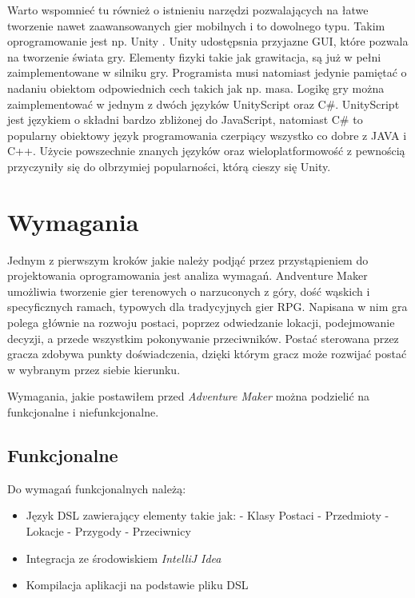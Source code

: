 \documentclass[openright]{xmgr}
\begin{document}
Warto wspomnieć tu również o istnieniu narzędzi pozwalających na łatwe tworzenie nawet zaawansowanych gier mobilnych i to dowolnego typu. Takim oprogramowanie jest np. Unity \cite{Unity3D:2017:Doc}. Unity udostępsnia przyjazne GUI, które pozwala na tworzenie świata gry. Elementy fizyki takie jak grawitacja, są już w pełni zaimplementowane w silniku gry. Programista musi natomiast jedynie pamiętać o nadaniu obiektom odpowiednich cech takich jak np. masa. Logikę gry można zaimplementować w jednym z dwóch języków UnityScript oraz C\#. UnityScript jest językiem o składni bardzo zbliżonej do JavaScript, natomiast C\# to popularny obiektowy język programowania czerpiący wszystko co dobre z JAVA i C++. Użycie powszechnie znanych języków oraz wieloplatformowość z pewnością przyczyniły się do olbrzymiej popularności, którą cieszy się Unity.


\chapter{Wymagania}

Jednym z pierwszym kroków jakie należy podjąć przez przystąpieniem do projektowania oprogramowania jest analiza wymagań. Andventure Maker umożliwia tworzenie gier terenowych o narzuconych z góry, dość wąskich i specyficznych ramach, typowych dla tradycyjnych gier RPG. Napisana w nim gra polega głównie na rozwoju postaci, poprzez odwiedzanie lokacji, podejmowanie decyzji, a przede wszystkim pokonywanie przeciwników. Postać sterowana przez gracza zdobywa punkty doświadczenia, dzięki którym gracz może rozwijać postać w wybranym przez siebie kierunku. 

Wymagania, jakie postawiłem przed \textit{Adventure Maker} można podzielić na funkcjonalne i niefunkcjonalne.

\section{Funkcjonalne}
Do wymagań funkcjonalnych należą:
\begin{itemize}
\item Język DSL zawierający elementy takie jak:
\subitem - Klasy Postaci
\subitem - Przedmioty
\subitem - Lokacje
\subitem - Przygody
\subitem - Przeciwnicy
\item Integracja ze środowiskiem \textit{IntelliJ Idea}
\item Kompilacja aplikacji na podstawie pliku DSL 
\end{itemize}
\end{document}
